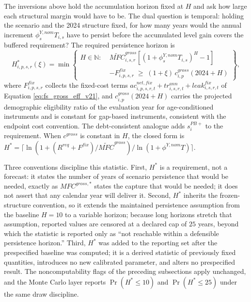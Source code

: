 \documentclass[11pt,a4paper]{article}
\begin{document}
The inversions above hold the accumulation horizon fixed at $H$ and ask how large each
structural margin would have to be. The dual question is temporal: holding the scenario and
the 2024 structure fixed, for how many years would the annual increment
$\phi^{Y,nom}_{s}T_{i,s}$ have to persist before the accumulated level gain covers the
buffered requirement? The required persistence horizon is
\begin{equation}\label{eq:h_star_inversion}
    H^{*}_{i,p,s,r}(\xi)=\min\left\{
    \begin{aligned}
    H\in\mathbb{N}:\;&\widetilde{MFC}^{gross}_{i,s,r}\left[(1+\phi^{Y,nom}_{s}T_{i,s})^{H}-1\right]\\
    &-F^{fix}_{i,p,s,r}\;\geq\;(1+\xi)\,c^{gross}_{i,p}(2024+H)
    \end{aligned}
    \right\},
\end{equation}
where $F^{fix}_{i,p,s,r}$ collects the fixed-cost terms $ac^{net,fix}_{i,p,s,r,t}+tr^{ann}_{i,s,r,t}+leak^{fix}_{i,s,r,t}$ of Equation \eqref{eq:fs_gross_eff_v21}, and $c^{gross}_{i,p}(2024+H)$ carries the projected demographic eligibility ratio of the
evaluation year for age-conditioned instruments and is constant for gap-based instruments,
consistent with the endpoint cost convention. The debt-consistent analogue adds
$s^{PB+}_{i}$ to the requirement. When $c^{gross}$ is constant in $H$, the closed form is
$H^{*}=\lceil \ln\!\left(1+(R^{req}+F^{fix})/\widetilde{MFC}^{gross}\right)/\ln(1+\phi^{Y,nom}T)\rceil$.

Three conventions discipline this statistic. First, $H^{*}$ is a requirement, not a
forecast: it states the number of years of scenario persistence that would be needed,
exactly as $MFC^{gross,*}$ states the capture that would be needed; it does not assert that
any calendar year will deliver it. Second, $H^{*}$ inherits the frozen-structure convention,
so it extends the maintained persistence assumption from the baseline $H=10$ to a variable
horizon; because long horizons stretch that assumption, reported values are censored at a
declared cap of $25$ years, beyond which the statistic is reported only as ``not reachable
within a defensible persistence horizon.'' Third, $H^{*}$ was added to the reporting set
after the prespecified baseline was computed; it is a derived statistic of previously
fixed quantities, introduces no new calibrated parameter, and alters no prespecified
result. The noncomputability flags of the preceding subsections apply unchanged, and the
Monte Carlo layer reports $\Pr(H^{*}\leq 10)$ and $\Pr(H^{*}\leq 25)$ under the same draw
discipline.
\end{document}

